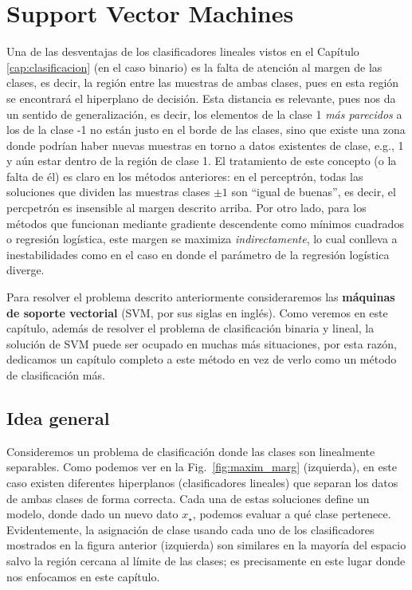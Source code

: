 \section{Support Vector Machines}

Una de las desventajas de los clasificadores lineales vistos en el Capítulo \ref{cap:clasificacion} (en el caso binario) es la falta de atención al margen de las clases, es decir, la región entre las muestras de ambas clases, pues en esta región se encontrará el hiperplano de decisión. Esta distancia es relevante, pues nos da un sentido de generalización, es decir,  los elementos de la clase 1  \emph{más parecidos} a los de la clase -1 no están justo en el borde de las clases, sino que existe una zona donde podrían haber nuevas muestras en torno a datos existentes de clase, e.g., 1 y aún estar dentro de la región de clase 1. El tratamiento de este concepto (o la falta de él) es claro en los métodos anteriores: en el perceptrón, todas las soluciones que dividen las muestras clases $\pm 1$ son ``igual de buenas'', es decir, el percpetrón es insensible al margen descrito arriba. Por otro lado, para los métodos que funcionan mediante gradiente descendente como mínimos cuadrados o regresión logística, este margen se maximiza \emph{indirectamente}, lo cual conlleva a inestabilidades como en el caso en donde el parámetro de la regresión logística diverge. 


Para resolver el problema descrito anteriormente consideraremos las \textbf{máquinas de soporte vectorial} (SVM, por sus siglas en inglés). Como veremos en este capítulo, además de resolver el problema de clasificación binaria y lineal, la solución de SVM puede ser ocupado en muchas más situaciones, por esta razón, dedicamos un capítulo completo a este método en vez de verlo como un método de clasificación más. 

\subsection{Idea general}

Consideremos un problema de clasificación donde las clases son linealmente separables. Como podemos ver en la Fig.~\ref{fig:maxim_marg} (izquierda), en este caso existen diferentes hiperplanos (clasificadores lineales) que separan los datos de ambas clases de forma correcta. Cada una de estas soluciones define un modelo, donde dado un nuevo dato $x_\star$, podemos evaluar a qué clase pertenece. Evidentemente, la asignación de clase usando cada uno de los clasificadores mostrados en la figura  anterior (izquierda) son similares en la mayoría del espacio salvo la región cercana al límite de las clases; es precisamente en este lugar donde nos enfocamos en este capítulo. 


